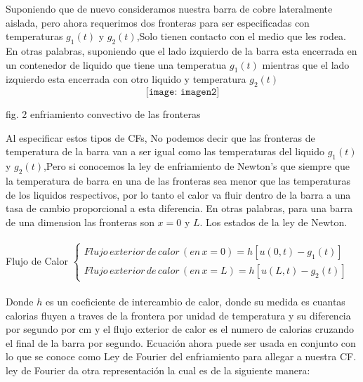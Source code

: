 \documentclass[10pt,a4paper]{report}
\begin{document}
Suponiendo que de nuevo consideramos nuestra barra de cobre lateralmente aislada, pero ahora requerimos dos fronteras para ser especificadas con temperaturas $g_1(t)$ y $g_2(t)$,Solo tienen contacto con el medio que les rodea. En otras palabras, suponiendo que el lado izquierdo de la barra esta encerrada en un contenedor de liquido que tiene una temperatua $g_1(t)$ mientras que el lado izquierdo esta encerrada con otro liquido y temperatura $g_2(t)$
\\ $$\texttt{[image: imagen2]}$$ 
\begin{center}
{\small fig. 2 enfriamiento convectivo de las fronteras}
\end{center}
Al especificar estos tipos de CFs, No podemos decir que las fronteras de temperatura de la barra van a ser igual como las temperaturas del liquido $g_1(t)$ y $g_2(t)$,Pero si conocemos la ley de enfriamiento de Newton's que siempre que la temperatura de barra en una de las fronteras sea menor que las temperaturas de los liquidos respectivos, por lo tanto el calor va fluir dentro de la barra a una tasa de cambio proporcional a esta diferencia. En otras palabras, para una barra de una dimension las fronteras son $x = 0 $ y $L$. Los estados de la ley de Newton.
\\\\ Flujo de Calor $
\left \{ \begin{matrix}
\displaystyle Flujo \, exterior \, de \,calor \, (en \, x = 0) = h[u(0,t)-g_1(t)] 
\\
\displaystyle Flujo\, exterior \, de \,calor \, (en \, x = L) = h[u(L,t)-g_2(t)] 
\end{matrix} \right. $
\\\\Donde $h$ es un coeficiente de intercambio de calor, donde su medida es cuantas calorias fluyen a traves de la frontera por unidad de temperatura y su diferencia por segundo por cm y el flujo exterior de calor es el numero de calorias cruzando el final de la barra por segundo. Ecuación ahora puede ser usada en conjunto con lo que se conoce como Ley de Fourier del enfriamiento para allegar a nuestra CF. ley de Fourier da otra representación la cual es de la siguiente manera:
\\\\
\newpage 
\end{document}
